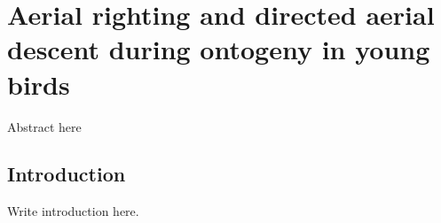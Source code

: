 
\chapter{Aerial righting and directed aerial descent during ontogeny in young birds}
\label{ch:1}

Abstract here  

\section{Introduction}
\label{sec:1intro}

Write introduction here. 

%
%
%
%


